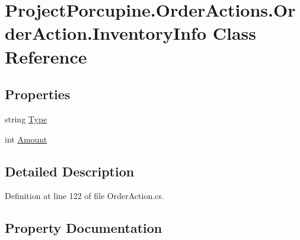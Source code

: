 \hypertarget{class_project_porcupine_1_1_order_actions_1_1_order_action_1_1_inventory_info}{}\section{Project\+Porcupine.\+Order\+Actions.\+Order\+Action.\+Inventory\+Info Class Reference}
\label{class_project_porcupine_1_1_order_actions_1_1_order_action_1_1_inventory_info}
\subsection*{Properties}
\begin{DoxyCompactItemize}
\item 
string \hyperlink{class_project_porcupine_1_1_order_actions_1_1_order_action_1_1_inventory_info_adaaafc68d7ac7e114cacddc12909759b}{Type}
\item 
int \hyperlink{class_project_porcupine_1_1_order_actions_1_1_order_action_1_1_inventory_info_a9bab01a50bf2edab02debc4f45195268}{Amount}
\end{DoxyCompactItemize}


\subsection{Detailed Description}


Definition at line 122 of file Order\+Action.\+cs.



\subsection{Property Documentation}
\mbox{\label{class_project_porcupine_1_1_order_actions_1_1_order_action_1_1_inventory_info_a9bab01a50bf2edab02debc4f45195268}} 
